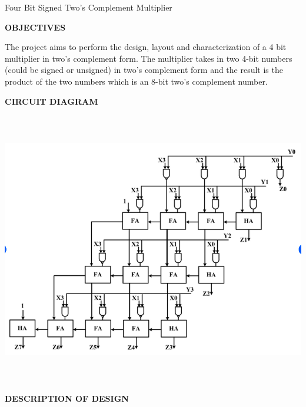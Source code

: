 \documentclass[12pt]{report}
\begin{document}
	\begin{center}
		\begin{Large}
			Four Bit Signed Two's Complement Multiplier
		\end{Large}
	\end{center}
	\vspace{10pt}
	\begin{flushleft}
		\begin{Large}
			\textbf{OBJECTIVES}
		\end{Large}
	\end{flushleft}
	The project aims to perform the design, layout and characterization of a 4 bit multiplier in two's complement form. The multiplier takes in two 4-bit numbers (could be signed or unsigned) in two's complement form and the result is the product of the two numbers which is an 8-bit two's complement number.
	\vspace{3pt}
	\begin{flushleft}
		\begin{Large}
			\textbf{CIRCUIT DIAGRAM}
		\end{Large}
	\end{flushleft}
	\begin{center}
	\includegraphics[height=12cm, width=15cm]{CircuitDiagram}
	\end{center}
	\vspace{3pt}
	\begin{flushleft}
		\begin{Large}
			\textbf{DESCRIPTION OF DESIGN}
		\end{Large}
	\end{flushleft}
\end{document}

